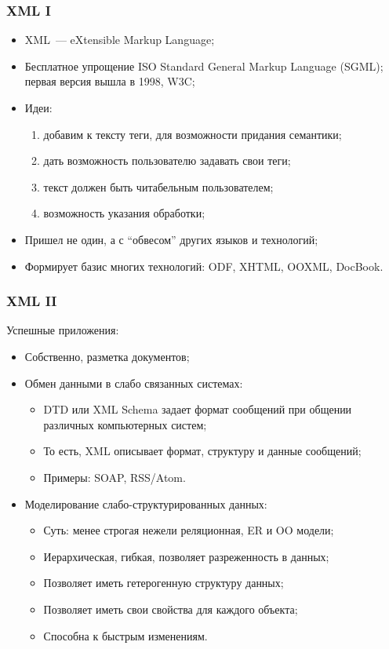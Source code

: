 \documentclass{beamer}
\begin{document}
\begin{frame}
\frametitle{XML I}

\begin{itemize}
  \setlength\itemsep{1em}
  \item XML~--- eXtensible Markup Language;
  \item Бесплатное упрощение ISO Standard General Markup Language (SGML); первая версия вышла в 1998, W3C;
  \item Идеи: 
  \begin{enumerate}
    \item добавим к тексту теги, для возможности придания семантики;
    \item дать возможность пользователю задавать свои теги;
    \item текст должен быть читабельным пользователем;
    \item возможность указания обработки;
  \end{enumerate}
  \item Пришел не один, а с ``обвесом'' других языков и технологий;
  \item Формирует базис многих технологий: ODF, XHTML, OOXML, DocBook.
\end{itemize}
\end{frame}

\begin{frame}
\frametitle{XML II}

Успешные приложения:

\begin{itemize}
  \setlength\itemsep{1em}
  \item Собственно, разметка документов;
  \item Обмен данными в слабо связанных системах:
  \begin{itemize}
    \item DTD или XML Schema задает формат сообщений при общении различных компьютерных систем;
    \item То есть, XML описывает формат, структуру и данные сообщений;
    \item Примеры: SOAP, RSS/Atom.
  \end{itemize}
  \item Моделирование слабо-структурированных данных:
  \begin{itemize}
    \item Суть: менее строгая нежели реляционная, ER и OO модели;
    \item Иерархическая, гибкая, позволяет разреженность в данных;
    \item Позволяет иметь гетерогенную структуру данных;
    \item Позволяет иметь свои свойства для каждого объекта;
    \item Способна к быстрым изменениям.
  \end{itemize}  
\end{itemize}
\end{frame}
\end{document}
